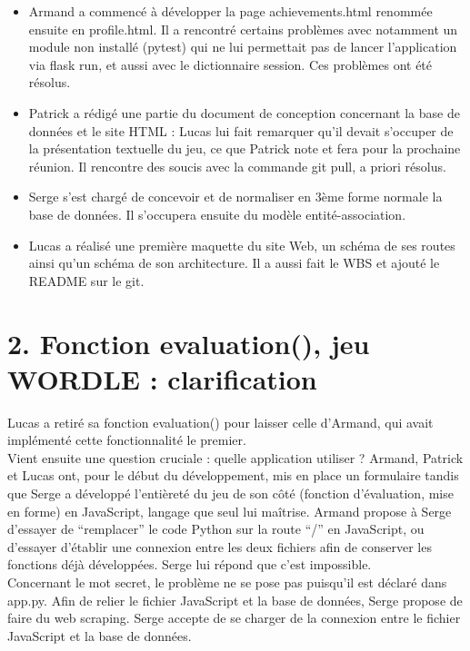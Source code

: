 \begin{itemize}
\item Armand a commencé à développer la page achievements.html renommée ensuite en profile.html. Il a rencontré certains problèmes avec notamment un module non installé (pytest) qui ne lui permettait pas de lancer l’application via flask run, et aussi avec le dictionnaire session. Ces problèmes ont été résolus.
\item Patrick a rédigé une partie du document de conception concernant la base de données et le site HTML : Lucas lui fait remarquer qu’il devait s’occuper de la présentation textuelle du jeu, ce que Patrick note et fera pour la prochaine réunion. Il rencontre des soucis avec la commande git pull, a priori résolus.
\item Serge s’est chargé de concevoir et de normaliser en 3ème forme normale la base de données. Il s’occupera ensuite du modèle entité-association.
\item Lucas a réalisé une première maquette du site Web, un schéma de ses routes ainsi qu’un schéma de son architecture. Il a aussi fait le WBS et ajouté le README sur le git.
\end{itemize}

\section*{2. Fonction evaluation(), jeu WORDLE : clarification}
\tabto{1cm}Lucas a retiré sa fonction evaluation() pour laisser celle d’Armand, qui avait implémenté cette fonctionnalité le premier.\\
Vient ensuite une question cruciale : quelle application utiliser ? Armand, \tabto{1cm}Patrick et Lucas ont, pour le début du développement, mis en place un formulaire tandis que Serge a développé l’entièreté du jeu de son côté (fonction d’évaluation, mise en forme) en JavaScript, langage que seul lui maîtrise. Armand propose à Serge d’essayer de “remplacer” le code Python sur la route “/” en JavaScript, ou d’essayer d’établir une connexion entre les deux fichiers afin de conserver les fonctions déjà développées. Serge lui répond que c’est impossible.\\ 
\tabto{1cm}Concernant le mot secret, le problème ne se pose pas puisqu’il est déclaré dans app.py. Afin de relier le fichier JavaScript et la base de données, Serge propose de faire du web scraping. Serge accepte de se charger de la connexion entre le fichier JavaScript et la base de données.\\

